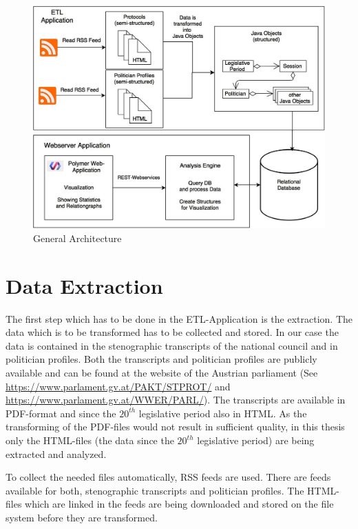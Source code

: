 \begin{figure}
	\centering
	\includegraphics[width=\textwidth]{imgs/overall_architecture}
	\caption{General Architecture}
	\label{fig:general_architecture}
\end{figure}

\section{Data Extraction}
\label{sec:data_extraction}
The first step which has to be done in the ETL-Application is the extraction. The data which is to be transformed has to be collected and stored. In our case the data is contained in the stenographic transcripts of the national council and in politician profiles. Both the transcripts and politician profiles are publicly available and can be found at the website of the Austrian parliament (See \url{https://www.parlament.gv.at/PAKT/STPROT/} and \url{https://www.parlament.gv.at/WWER/PARL/}). The transcripts are available in PDF-format and since the $20^{th}$ legislative period also in HTML. As the transforming of the PDF-files would not result in sufficient quality, in this thesis only the HTML-files (the data since the $20^{th}$ legislative period) are being extracted and analyzed.

To collect the needed files automatically, RSS feeds are used. There are feeds available for both, stenographic transcripts and politician profiles. The HTML-files which are linked in the feeds are being downloaded and stored on the file system before they are transformed.

